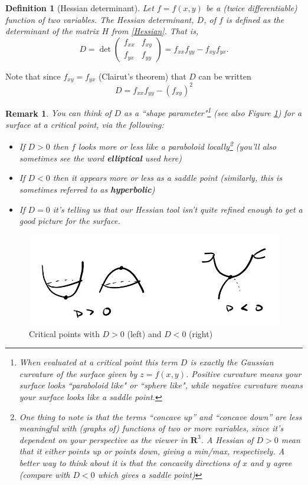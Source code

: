 \documentclass[12pt]{article}
\numberwithin{equation}{subsection}
\numberwithin{figure}{subsection}
\newtheorem{defn}[subsection]{Definition}
\theoremstyle{note}
\newtheorem{remark}[subsection]{Remark}
\begin{document}
{\begin{defn}[Hessian determinant] Let $f=f(x,y)$ be a (twice differentiable) function of two variables. The \textit{Hessian determinant}, $D$, of $f$ is defined as the determinant of the matrix $H$ from \eqref{Hessian}. That is, \[ D=\det \begin{pmatrix} f_{xx} & f_{xy} \\ f_{yx} & f_{yy} \end{pmatrix} = f_{xx}f_{yy}-f_{xy}f_{yx}.\]
\end{defn}

Note that since $f_{xy}=f_{yx}$ (Clairut's theorem) that $D$ can be written \begin{equation} \label{Hess-det} D=f_{xx}f_{yy}-(f_{xy})^2\end{equation} 

\begin{remark}You can think of $D$ as a ``shape parameter"\footnote{When evaluated at a critical point this term $D$ is exactly the \textit{Gaussian curvature} of the surface given by $z=f(x,y)$. Positive curvature means your surface looks ``paraboloid like" or ``sphere like", while negative curvature means your surface looks like a saddle point.}  (see also Figure \ref{fig-2nd-der-test}) for a surface at a critical point, via the following: 
\begin{itemize} 
\item If $D>0$ then $f$ looks more or less like a paraboloid locally\footnote{One thing to note is that the terms ``concave up'' and ``concave down'' are less meaningful with (graphs of) functions of two or more variables, since it's dependent on your perspective as the viewer in $\mathbf{R}^3$. A Hessian of $D>0$  mean that it either points up or points down, giving a min/max, respectively. A better way to think about it is that the concavity directions of $x$ and $y$ agree (compare with $D<0$ which gives a saddle point)} (you'll also sometimes see the word \textbf{elliptical} used here)
\item If $D<0$ then it appears more or less as a saddle point (similarly, this is sometimes referred to as \textbf{hyperbolic})
\item If $D=0$ it's telling us that our Hessian tool isn't quite refined enough to get a good picture for the surface.
\end{itemize}\end{remark}

\begin{figure}[h!]
\centering
\includegraphics[width=120mm]{Images/2nd-der-test}
\caption{Critical points with $D>0$  (left) and $D<0$ (right)}
\label{fig-2nd-der-test}
\end{figure}

}
\end{document}
